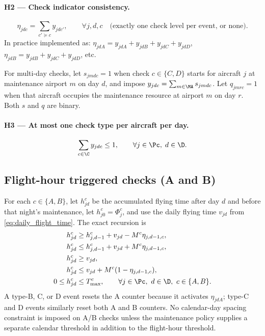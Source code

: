 \paragraph{H2 — Check indicator consistency.}
\begin{equation}\label{eq:hier2}
  \eta_{jdc} = \sum_{c' \succeq c} y_{jdc'}, \qquad \forall j,d,c
  \quad \text{(exactly one check level per event, or none)}.
\end{equation}
In practice implemented as: $\eta_{jdA} = y_{jdA} + y_{jdB} + y_{jdC} +
y_{jdD}$, $\eta_{jdB} = y_{jdB} + y_{jdC} + y_{jdD}$, etc.

For multi-day checks, let $s_{jmdc}=1$ when check $c\in\{C,D\}$ starts for
aircraft $j$ at maintenance airport $m$ on day $d$, and impose
$y_{jdc}=\sum_{m\in\MA}s_{jmdc}$. Let $q_{jmrc}=1$ when that aircraft occupies
the maintenance resource at airport $m$ on day $r$. Both $s$ and $q$ are
binary.

\paragraph{H3 — At most one check type per aircraft per day.}
\begin{equation}\label{eq:hier3}
  \sum_{c \in \C} y_{jdc} \le 1, \qquad \forall j \in \Pc,\; d \in \D.
\end{equation}

\subsection{Flight-hour triggered checks (A and B)}

For each $c\in\{A,B\}$, let $h^c_{jd}$ be the accumulated flying time after
day $d$ and before that night's maintenance, let
$h^c_{j0}=\Phi^c_j$, and use the daily flying time $v_{jd}$ from
\eqref{eq:daily_flight_time}. The exact recursion is
\begin{align}
  h^c_{jd}
  &\ge h^c_{j,d-1}+v_{jd}-M^c\eta_{j,d-1,c},
  \label{eq:c11_state_ab_lower}\\
  h^c_{jd}
  &\le h^c_{j,d-1}+v_{jd}+M^c\eta_{j,d-1,c},
  \label{eq:c11_state_ab_upper}\\
  h^c_{jd}&\ge v_{jd},
  \label{eq:c11_state_ab_reset_lower}\\
  h^c_{jd}
  &\le v_{jd}+M^c(1-\eta_{j,d-1,c}),
  \label{eq:c11_state_ab_reset_upper}\\
  0\le h^c_{jd}&\le T^c_{\max},
  \qquad \forall j\in\Pc,\ d\in\D,\ c\in\{A,B\}.
  \label{eq:c11_state_ab_bound}
\end{align}
A type-B, C, or D event resets the A counter because it activates
$\eta_{jdA}$; type-C and D events similarly reset both A and B counters.
No calendar-day spacing constraint is imposed on A/B checks unless the
maintenance policy supplies a separate calendar threshold in addition to the
flight-hour threshold.

